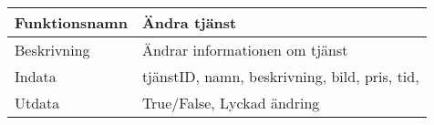 \documentclass[11pt, titlepage, oneside, a4paper]{article}	%
\begin{document}
\begin{tabular}{ll}
\hline
Funktionsnamn & Ändra tjänst              \\ \hline
Beskrivning   & Ändrar informationen om tjänst \\ \hline
Indata        & tjänstID, namn, beskrivning, bild, pris, tid,   \\ \hline
Utdata        & True/False, Lyckad ändring  \\ \hline
\end{tabular}

 


\newpage
\appendix
\end{document}
